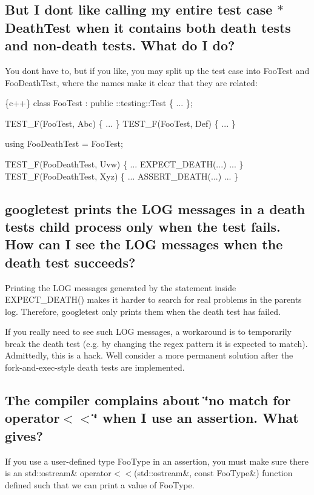 \subsection*{But I don\textquotesingle{}t like calling my entire test case $\ast$\+Death\+Test when it contains both death tests and non-\/death tests. What do I do?}

You don\textquotesingle{}t have to, but if you like, you may split up the test case into {\ttfamily Foo\+Test} and {\ttfamily Foo\+Death\+Test}, where the names make it clear that they are related\+:


\begin{DoxyCode}
\{c++\}
class FooTest : public ::testing::Test \{ ... \};

TEST\_F(FooTest, Abc) \{ ... \}
TEST\_F(FooTest, Def) \{ ... \}

using FooDeathTest = FooTest;

TEST\_F(FooDeathTest, Uvw) \{ ... EXPECT\_DEATH(...) ... \}
TEST\_F(FooDeathTest, Xyz) \{ ... ASSERT\_DEATH(...) ... \}
\end{DoxyCode}


\subsection*{googletest prints the L\+OG messages in a death test\textquotesingle{}s child process only when the test fails. How can I see the L\+OG messages when the death test succeeds?}

Printing the L\+OG messages generated by the statement inside {\ttfamily E\+X\+P\+E\+C\+T\+\_\+\+D\+E\+A\+T\+H()} makes it harder to search for real problems in the parent\textquotesingle{}s log. Therefore, googletest only prints them when the death test has failed.

If you really need to see such L\+OG messages, a workaround is to temporarily break the death test (e.\+g. by changing the regex pattern it is expected to match). Admittedly, this is a hack. We\textquotesingle{}ll consider a more permanent solution after the fork-\/and-\/exec-\/style death tests are implemented.

\subsection*{The compiler complains about \char`\"{}no match for \textquotesingle{}operator$<$$<$\textquotesingle{}\char`\"{} when I use an assertion. What gives?}

If you use a user-\/defined type {\ttfamily Foo\+Type} in an assertion, you must make sure there is an {\ttfamily std\+::ostream\& operator$<$$<$(std\+::ostream\&, const Foo\+Type\&)} function defined such that we can print a value of {\ttfamily Foo\+Type}.

